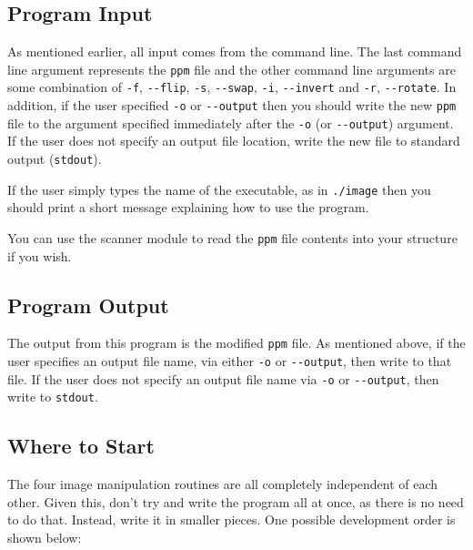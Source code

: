 \documentclass[12pt]{article}
\begin{document}
\subsection*{Program Input}

As mentioned earlier, all input comes from the command line.  The last command
line argument represents the {\tt ppm} file and the other command line arguments
are some combination of {\tt -f}, {\tt -{}-flip},
{\tt -s}, {\tt -{}-swap}, {\tt -i}, {\tt -{}-invert}
and {\tt -r}, {\tt -{}-rotate}.
In addition, if the user specified {\tt -o} or {\tt -{}-output} then you should
write the new {\tt ppm} file to the argument specified immediately after the
{\tt -o} (or {\tt -{}-output}) argument.  If the user does not specify an output
file location, write the new file to standard output ({\tt stdout}).

If the user simply types the name of the executable, as in {\tt ./image} then 
you should print a short message explaining how to use the program.

You can use the scanner module to read the {\tt ppm} file contents into your
structure if you wish.

\subsection*{Program Output}

The output from this program is the modified {\tt ppm} file.  As
mentioned above, if the user specifies an output file name,
via either {\tt -o} or {\tt -{}-output}, then
write to that file.  If the user does not specify an output
file name via {\tt -o} or {\tt -{}-output}, then write to {\tt stdout}.

\subsection*{Where to Start}

The four image manipulation routines are all completely independent of each
other.  Given this, don't try and write the program all at once, as there is
no need to do that.  Instead, write it in smaller pieces.  One possible
development order is shown below:
\end{document}

